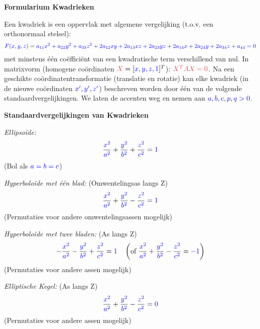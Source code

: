 \documentclass[12pt]{article}
\newcommand{\scalar}[1]{\textcolor{scalarBrightBlue}{#1}}
\newcommand{\mat}[1]{\textcolor{matrixSoftRed}{#1}}
\begin{document}
\begin{center}
\Large \textbf{Formularium Kwadrieken}
\end{center}

\vspace{1em} %

Een kwadriek is een oppervlak met algemene vergelijking (t.o.v. een orthonormaal stelsel):
\[
\scalar{F(x,y,z)} = \scalar{a_{11}x^2+a_{22}y^2+a_{33}z^2+2a_{12}xy+2a_{13}xz+2a_{23}yz + 2a_{14}x+2a_{24}y+2a_{34}z+a_{44}=0}
\]
met minstens één coëfficiënt van een kwadratische term verschillend van nul.
In matrixvorm (homogene coördinaten $\mat{X} = [\scalar{x, y, z, 1}]^T$): $\mat{X^T A X = 0}$.
Na een geschikte coördinatentransformatie (translatie en rotatie) kan elke kwadriek (in de nieuwe coördinaten $\scalar{x', y', z'}$) beschreven worden door één van de volgende standaardvergelijkingen. We laten de accenten weg en nemen aan $\scalar{a, b, c, p, q > 0}$.

\vspace{1.5em} %
{\centering
\textcolor{headerBrown}{\large\textbf{Standaardvergelijkingen van Kwadrieken}}
\par
}%

\textit{Ellipsoïde:}
\[
\frac{\scalar{x^2}}{\scalar{a^2}} + \frac{\scalar{y^2}}{\scalar{b^2}} + \frac{\scalar{z^2}}{\scalar{c^2}} = \scalar{1}
\]
(Bol als $\scalar{a=b=c}$)

\vspace{1em}
\textit{Hyperboloïde met één blad:} (Omwentelingsas langs Z)
\[
\frac{\scalar{x^2}}{\scalar{a^2}} + \frac{\scalar{y^2}}{\scalar{b^2}} - \frac{\scalar{z^2}}{\scalar{c^2}} = \scalar{1}
\]
(Permutaties voor andere omwentelingsassen mogelijk)

\vspace{1em}
\textit{Hyperboloïde met twee bladen:} (As langs Z)
\[
-\frac{\scalar{x^2}}{\scalar{a^2}} - \frac{\scalar{y^2}}{\scalar{b^2}} + \frac{\scalar{z^2}}{\scalar{c^2}} = \scalar{1} \quad \left(\text{of } \frac{\scalar{x^2}}{\scalar{a^2}} + \frac{\scalar{y^2}}{\scalar{b^2}} - \frac{\scalar{z^2}}{\scalar{c^2}} = \scalar{-1}\right)
\]
(Permutaties voor andere assen mogelijk)

\vspace{1em}
\textit{Elliptische Kegel:} (As langs Z)
\[
\frac{\scalar{x^2}}{\scalar{a^2}} + \frac{\scalar{y^2}}{\scalar{b^2}} - \frac{\scalar{z^2}}{\scalar{c^2}} = \scalar{0}
\]
(Permutaties voor andere assen mogelijk)
\end{document}

